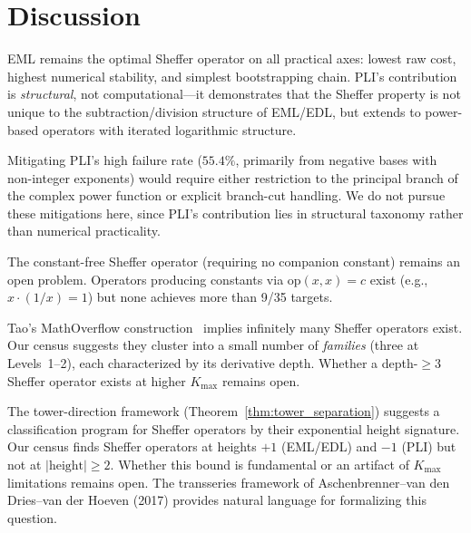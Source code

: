 \documentclass[10pt,twocolumn]{article}
\theoremstyle{remark}
\begin{document}
\section{Discussion}

EML remains the optimal Sheffer operator on all practical axes: lowest raw cost, highest numerical stability, and simplest bootstrapping chain. PLI's contribution is \emph{structural}, not computational---it demonstrates that the Sheffer property is not unique to the subtraction/division structure of EML/EDL, but extends to power-based operators with iterated logarithmic structure.

Mitigating PLI's high failure rate ($55.4\%$, primarily from negative bases with non-integer exponents) would require either restriction to the principal branch of the complex power function or explicit branch-cut handling. We do not pursue these mitigations here, since PLI's contribution lies in structural taxonomy rather than numerical practicality.

The constant-free Sheffer operator (requiring no companion constant) remains an open problem. Operators producing constants via $\mathrm{op}(x,x) = c$ exist (e.g., $x \cdot (1/x) = 1$) but none achieves more than 9/35 targets.

Tao's MathOverflow construction~\cite{tao_mo} implies infinitely many Sheffer operators exist. Our census suggests they cluster into a small number of \emph{families} (three at Levels~1--2), each characterized by its derivative depth. Whether a depth-$\geq 3$ Sheffer operator exists at higher $K_{\max}$ remains open.

The tower-direction framework (Theorem~\ref{thm:tower_separation}) suggests a classification program for Sheffer operators by their exponential height signature. Our census finds Sheffer operators at heights $+1$ (EML/EDL) and $-1$ (PLI) but not at $|{\mathrm{height}}| \geq 2$. Whether this bound is fundamental or an artifact of $K_{\max}$ limitations remains open. The transseries framework of Aschenbrenner--van den Dries--van der Hoeven (2017) provides natural language for formalizing this question.
\end{document}
